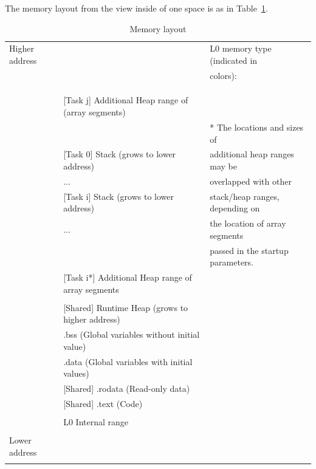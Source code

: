 \documentclass[a4paper]{article}
\begin{document}
The memory layout from the view inside of one space is as in Table~\ref{table:c0-memory}.

\begin{table}[h]
\centering
\label{table:c0-memory}
\caption{Memory layout}
\begin{tabular}{|l|l|l|}
\hline
Higher address & & L0 memory type (indicated in\\
 & & colors):\\\cline{2-2}
 & & \color{webgreen}{Heap} \\ %
 & & \color{red!20!white}{Stack} \\ %
 & & \\ \cline{2-2}
 & \colorbox{webgreen}{[Task j] Additional Heap range of (array segments)} & \\ \cline{2-2}
 & & * The locations and sizes of\\ \cline{2-2}
 & \colorbox{red!20!white}{[Task 0] Stack (grows to lower address)} & additional heap ranges may be\\\cline{2-2}
 & \colorbox{red!20!white}{...} & overlapped with other\\\cline{2-2}
 & \colorbox{red!20!white}{[Task i] Stack (grows to lower address)} & stack/heap ranges, depending on\\\cline{2-2}
 & \colorbox{red!20!white}{...} & the location of array segments\\\cline{2-2}
 & & passed in the startup parameters.\\\cline{2-2}
 & \colorbox{webgreen}{[Task i*] Additional Heap range of array segments} & \\\cline{2-2}
 & & \\\cline{2-2}
 & \colorbox{webgreen}{[Shared] Runtime Heap (grows to higher address)} & \\\cline{2-2}
 & \colorbox{webgreen}{.bss (Global variables without initial value)} & \\\cline{2-2}
 & \colorbox{webgreen}{.data (Global variables with initial values)} & \\\cline{2-2}
 & \colorbox{webgreen}{[Shared] .rodata (Read-only data)} & \\\cline{2-2}
 & \colorbox{webgreen}{[Shared] .text (Code)} & \\\cline{2-2}
 & & \\\cline{2-2}
 & L0 Internal range & \\\cline{2-2}
 & & \\\cline{2-2}
 Lower address & & \\
 & & \\\cline{2-2}
\hline
\end{tabular}
\end{table}
\end{document}
